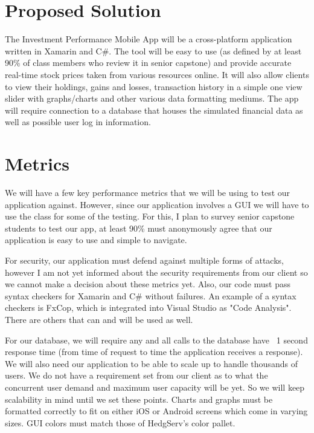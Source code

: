 \documentclass[letterpaper,10pt,titlepage]{article}
\begin{document}
\section{Proposed Solution}

The Investment Performance Mobile App will be a cross-platform application
written in Xamarin and C\#. The tool will be easy to use (as defined by at least
90\% of class members who review it in senior capstone) and provide accurate real-time
stock prices taken from various resources online. It will also allow clients 
to view their holdings, gains and losses, transaction history in a simple one view
slider with graphs/charts and other various data formatting mediums. The app
will require connection to a database that houses the simulated financial data
as well as possible user log in information.



\section{Metrics}

We will have a few key performance metrics that we will be using to test our
application against. However, since our application involves a GUI we will
have to use the class for some of the testing. For this, I plan to survey 
senior capstone students to test our app, at least 90\% must anonymously 
agree that our application is easy to use and simple to navigate. 

For security,
our application must defend against multiple forms of attacks, however I am not
yet informed about the security requirements from our client so we cannot make
a decision about these metrics yet. Also, our code must pass syntax checkers for 
Xamarin and C\# without failures. An example of a syntax checkers is FxCop, which
is integrated into Visual Studio as "Code Analysis". There are others that can
and will be used as well.

For our database, we will require any and all calls
to the database have ~1 second response time (from time of request to time 
the application receives a response). We will also need our application to be
able to scale up to handle thousands of users. We do not have a requirement 
set from our client as to what the concurrent user demand and maximum user
capacity will be yet. So we will keep scalability in mind until we set these
points. Charts and graphs must be formatted correctly to fit on either iOS or
Android screens which come in varying sizes. GUI colors must match those of
HedgServ's color pallet.
\end{document}
